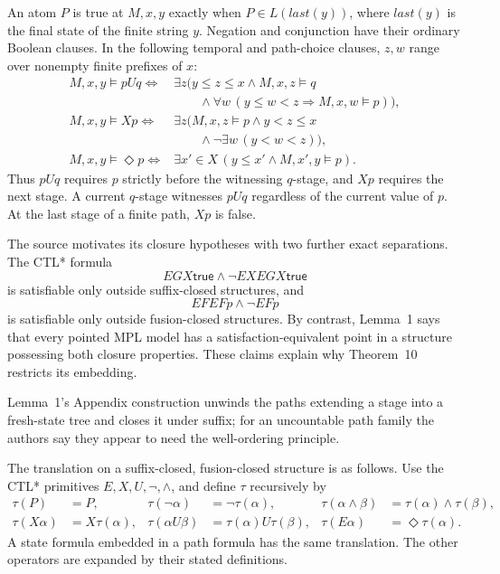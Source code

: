 An atom \(P\) is true at \(M,x,y\) exactly when \(P\in L(last(y))\),
where \(last(y)\) is the final state of the finite string \(y\).
Negation and conjunction have their ordinary Boolean clauses.
In the following temporal and path-choice clauses, \(z,w\) range over
nonempty finite prefixes of \(x\):
\[
\begin{aligned}
 M,x,y\models pUq
 \Longleftrightarrow{}&
 \exists z\bigl(
 y\leq z\leq x\land M,x,z\models q\\
 &\qquad\land
 \forall w\,
 (y\leq w<z\Rightarrow M,x,w\models p)\bigr),\\
 M,x,y\models Xp
 \Longleftrightarrow{}&
 \exists z\bigl(
 M,x,z\models p\land y<z\leq x\\
 &\qquad\land
 \neg\exists w\,(y<w<z)\bigr),\\
 M,x,y\models\Diamond p
 \Longleftrightarrow{}&
 \exists x'\in X\,
 (y\leq x'\land M,x',y\models p).
\end{aligned}
\]
Thus \(pUq\) requires \(p\) strictly before the witnessing \(q\)-stage,
and \(Xp\) requires the next stage.  A current \(q\)-stage witnesses
\(pUq\) regardless of the current value of \(p\).  At the last stage
of a finite path, \(Xp\) is false.

The source motivates its closure hypotheses with two further exact
separations.  The CTL* formula
\[
 EGX\mathsf{true}\land\neg EXEGX\mathsf{true}
\]
is satisfiable only outside suffix-closed structures, and
\[
 EFEFp\land\neg EFp
\]
is satisfiable only outside fusion-closed structures.  By contrast,
Lemma~1 says that every pointed MPL model has a satisfaction-equivalent point
in a structure possessing both closure properties.  These claims explain why
Theorem~10 restricts its embedding.

Lemma~1's Appendix construction unwinds the paths extending a stage into a
fresh-state tree and closes it under suffix; for an uncountable path family
the authors say they appear to need the well-ordering principle.

The translation on a suffix-closed, fusion-closed structure is as follows.
Use the CTL* primitives \(E,X,U,\neg,\land\), and define \(\tau\)
recursively by
\[
\begin{aligned}
 \tau(P)&=P,&
 \tau(\neg\alpha)&=\neg\tau(\alpha),&
 \tau(\alpha\land\beta)&=\tau(\alpha)\land\tau(\beta),\\
 \tau(X\alpha)&=X\tau(\alpha),&
 \tau(\alpha U\beta)&=\tau(\alpha)U\tau(\beta),&
 \tau(E\alpha)&=\Diamond\tau(\alpha).
\end{aligned}
\]
A state formula embedded in a path formula has the same translation.
The other operators are expanded by their stated definitions.

